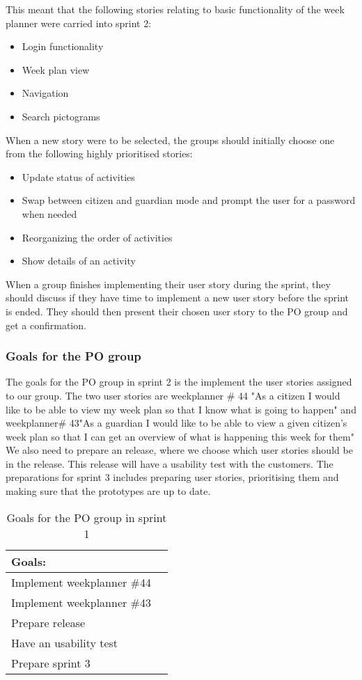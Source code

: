 This meant that the following stories relating to basic functionality of the week planner were carried into sprint 2:
\begin{itemize}
    \item Login functionality
    \item Week plan view
    \item Navigation
    \item Search pictograms
\end{itemize}
When a new story were to be selected, the groups should initially choose one from the following highly prioritised stories:
\begin{itemize}
    \item Update status of activities
    \item Swap between citizen and guardian mode and prompt the user for a password when needed
    \item Reorganizing the order of activities
    \item Show details of an activity
\end{itemize}
When a group finishes implementing their user story during the sprint, they should discuss if they have time to implement a new user story before the sprint is ended. They should then present their chosen user story to the PO group and get a confirmation.

\subsubsection{Goals for the PO group}
The goals for the PO group in sprint 2 is the implement the user stories assigned to our group.
The two user stories are weekplanner \# 44 "As a citizen I would like to be able to view my week plan so that I know what is going to happen" and weekplanner\# 43"As a guardian I would like to be able to view a given citizen's week plan so that I can get an overview of what is happening this week for them"
We also need to prepare an release, where we choose which user stories should be in the release.
This release will have a usability test with the customers.
The preparations for sprint 3 includes preparing user stories, prioritising them and making sure that the prototypes are up to date.
\begin{table}[H]
    \centering
    \begin{tabular}{|l|l|}
    \hline
    Goals:                                   \\ \hline
    Implement weekplanner \#44               \\ \hline
    Implement weekplanner \#43               \\ \hline
    Prepare release                          \\ \hline
    Have an usability test                   \\ \hline
    Prepare sprint 3                         \\ \hline
    \end{tabular}
    \caption{Goals for the PO group in sprint 1}
    \label{PO-goal-sprint-2-review}
\end{table}